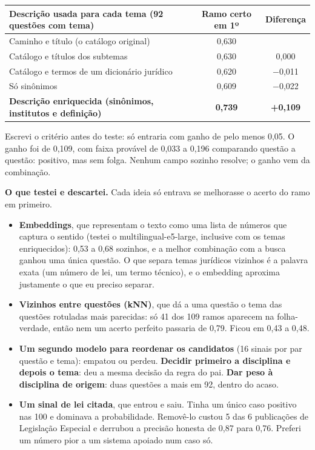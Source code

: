 \documentclass[11pt,a4paper]{article}
\newcommand{\bd}[1]{\textbf{#1}}
\begin{document}
\begin{center}
\small
\begin{tabular}{lcc}
\toprule
Descrição usada para cada tema (92 questões com tema) & Ramo certo em 1º & Diferença \\
\midrule
Caminho e título (o catálogo original) & 0,630 & \\
Catálogo e títulos dos subtemas & 0,630 & 0,000 \\
Catálogo e termos de um dicionário jurídico & 0,620 & $-$0,011 \\
Só sinônimos & 0,609 & $-$0,022 \\
\bd{Descrição enriquecida (sinônimos, institutos e definição)} & \bd{0,739} & \bd{+0,109} \\
\bottomrule
\end{tabular}
\end{center}
\vspace{-4pt}
{\small Escrevi o critério antes do teste: só entraria com ganho de pelo menos 0,05. O ganho foi
de 0,109, com faixa provável de 0,033 a 0,196 comparando questão a questão: positivo, mas sem
folga. Nenhum campo sozinho resolve; o ganho vem da combinação.}

\bd{O que testei e descartei.} Cada ideia só entrava se melhorasse o acerto do ramo em primeiro.
\begin{itemize}
\item \bd{Embeddings}, que representam o texto como uma lista de números que captura o sentido
      (testei o multilingual-e5-large, inclusive com os temas enriquecidos): 0,53 a 0,68 sozinhos,
      e a melhor combinação com a busca ganhou uma única questão. O que separa temas jurídicos
      vizinhos é a palavra exata (um número de lei, um termo técnico), e o embedding aproxima
      justamente o que eu preciso separar.
\item \bd{Vizinhos entre questões (kNN)}, que dá a uma questão o tema das questões rotuladas mais
      parecidas: só 41 dos 109 ramos aparecem na folha-verdade, então nem um acerto perfeito
      passaria de 0,79. Ficou em 0,43 a 0,48.
\item \bd{Um segundo modelo para reordenar os candidatos} (16 sinais por par questão e tema):
      empatou ou perdeu. \bd{Decidir primeiro a disciplina e depois o tema}: deu a mesma decisão
      da regra do pai. \bd{Dar peso à disciplina de origem}: duas questões a mais em 92, dentro do
      acaso.
\item \bd{Um sinal de lei citada}, que entrou e saiu. Tinha um único caso positivo nas 100 e
      dominava a probabilidade. Removê-lo custou 5 das 6 publicações de Legislação Especial e
      derrubou a precisão honesta de 0,87 para 0,76. Preferi um número pior a um sistema apoiado
      num caso só.
\end{itemize}
\end{document}
